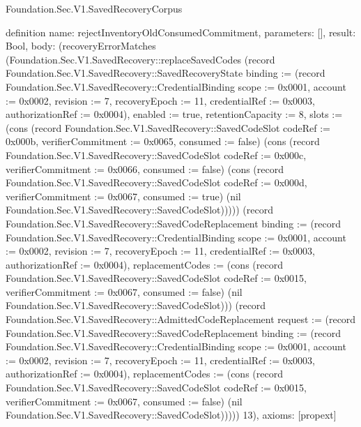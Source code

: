 \begin{lexlean}{Foundation.Sec.V1.SavedRecoveryCorpus}
\begin{semanticmodule}
definition{
  name: rejectInventoryOldConsumedCommitment,
  parameters: [],
  result: Bool,
  body: (recoveryErrorMatches (Foundation.Sec.V1.SavedRecovery::replaceSavedCodes (record Foundation.Sec.V1.SavedRecovery::SavedRecoveryState {binding := (record Foundation.Sec.V1.SavedRecovery::CredentialBinding {scope := 0x0001, account := 0x0002, revision := 7, recoveryEpoch := 11, credentialRef := 0x0003, authorizationRef := 0x0004}), enabled := true, retentionCapacity := 8, slots := (cons (record Foundation.Sec.V1.SavedRecovery::SavedCodeSlot {codeRef := 0x000b, verifierCommitment := 0x0065, consumed := false}) (cons (record Foundation.Sec.V1.SavedRecovery::SavedCodeSlot {codeRef := 0x000c, verifierCommitment := 0x0066, consumed := false}) (cons (record Foundation.Sec.V1.SavedRecovery::SavedCodeSlot {codeRef := 0x000d, verifierCommitment := 0x0067, consumed := true}) (nil Foundation.Sec.V1.SavedRecovery::SavedCodeSlot))))}) (record Foundation.Sec.V1.SavedRecovery::SavedCodeReplacement {binding := (record Foundation.Sec.V1.SavedRecovery::CredentialBinding {scope := 0x0001, account := 0x0002, revision := 7, recoveryEpoch := 11, credentialRef := 0x0003, authorizationRef := 0x0004}), replacementCodes := (cons (record Foundation.Sec.V1.SavedRecovery::SavedCodeSlot {codeRef := 0x0015, verifierCommitment := 0x0067, consumed := false}) (nil Foundation.Sec.V1.SavedRecovery::SavedCodeSlot))}) (record Foundation.Sec.V1.SavedRecovery::AdmittedCodeReplacement {request := (record Foundation.Sec.V1.SavedRecovery::SavedCodeReplacement {binding := (record Foundation.Sec.V1.SavedRecovery::CredentialBinding {scope := 0x0001, account := 0x0002, revision := 7, recoveryEpoch := 11, credentialRef := 0x0003, authorizationRef := 0x0004}), replacementCodes := (cons (record Foundation.Sec.V1.SavedRecovery::SavedCodeSlot {codeRef := 0x0015, verifierCommitment := 0x0067, consumed := false}) (nil Foundation.Sec.V1.SavedRecovery::SavedCodeSlot))})})) 13),
  axioms: [propext]
}


\end{semanticmodule}
\end{lexlean}
